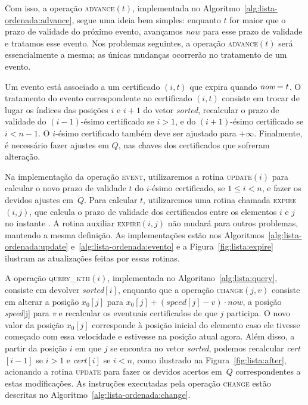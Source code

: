 Com isso, a operação \textsc{advance}$(t)$, implementada no
Algoritmo~\ref{alg:lista-ordenada:advance}, segue uma ideia bem simples: enquanto
$t$ for maior que o prazo de validade do próximo evento, avançamos
\textit{now} para esse prazo de validade e tratamos esse evento.
Nos problemas seguintes, a operação \textsc{advance}$(t)$ será essencialmente a
mesma;
as únicas mudanças ocorrerão no tratamento de um evento.



Um evento está associado a um certificado $(i, t)$ que expira quando
$\textit{now} = t$.
O tratamento do evento correspondente ao certificado $(i, t)$ consiste em trocar de lugar os
índices das posições $i$ e $i + 1$ do vetor \textit{sorted}, recalcular o prazo de validade do
$(i-1)$-ésimo certificado se $i > 1$, e do $(i + 1)$-ésimo
certificado se $i < n - 1$.
O $i$-ésimo certificado também deve ser ajustado para $+\infty$.
Finalmente, é necessário fazer ajustes em $Q$, nas chaves dos certificados que sofreram
alteração.

Na implementação da operação \textsc{event}, utilizaremos a rotina
\textsc{update}$(i)$ para calcular o novo prazo de validade $t$ do
$i$-ésimo certificado, se $1 \leq i < n$, e fazer os devidos ajustes
em~$Q$.
Para calcular $t$, utilizaremos uma rotina chamada \textsc{expire}$(i,
j)$, que calcula o prazo de validade dos certificados entre os
elementos $i$ e $j$ no instante \now.
A rotina auxiliar \textsc{expire}$(i, j)$ não mudará para outros problemas, mantendo a
mesma definição.
As implementações estão nos Algoritmos~\ref{alg:lista-ordenada:update}
e~\ref{alg:lista-ordenada:evento} e a Figura~\ref{fig:lista:expire}
ilustram as atualizações feitas por essas rotinas.







A operação \textsc{query\_kth}$(i)$, implementada no Algoritmo~\ref{alg:lista:query}, consiste em
devolver \textit{sorted}$[i]$, enquanto que a operação \textsc{change}$(j, v)$ consiste em alterar
a posição $x_0[j]$ para $x_0[j] + (\textit{speed}[j] - v)\cdot now$,
a posição \textit{speed}[j] para \textit{v} e recalcular os
eventuais certificados de que $j$ participa.
O novo valor da posição $x_0[j]$ corresponde à posição inicial do elemento caso ele tivesse
começado com essa velocidade e estivesse na posição atual agora.
Além disso, a partir da posição $i$ em que $j$ se encontra no vetor
\textit{sorted}, podemos recalcular \textit{cert}$[i - 1]$ se $i >
1$ e \textit{cert}$[i]$ se $i < n$, como ilustrado na Figura~\ref{fig:lista:after}, acionando a
rotina \textsc{update} para fazer
os devidos acertos em~$Q$ correspondentes a estas modificações.
As instruções executadas pela operação \textsc{change} estão descritas
no Algoritmo~\ref{alg:lista-ordenada:change}.

